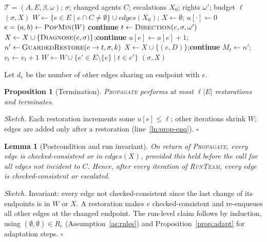 \documentclass[10pt, anonymous, conference]{IEEEtran}
\theoremstyle{definition}
\theoremstyle{plain}
\newtheorem{proposition}{Proposition}[section]
\newtheorem{lemma}{Lemma}[section]
\theoremstyle{remark}
\newcommand{\team}{\mathcal{T}}
\begin{document}
\begin{algorithm}[t]
\caption{\textsc{Propagate}: consistency over the network (L0)}
\label{alg:prop}
\small
\begin{algorithmic}[1]
\Input $\team=(A,E,\beta,\omega)$; $\sigma$; changed agents $C$;
escalations $X_0$; rights $\omega'$; budget $\ell$
\Output $(\sigma,X)$
\State $W\gets\{e\in E\mid e\cap C\neq\emptyset\}\cup\mathit{edges}(X_0)$;\;
       $X\gets\emptyset$;\; $u[\cdot]\gets0$
  \State $e=(a,b)\gets\textsc{PopMin}(W)$
   \textbf{continue}\label{ln:prop-ok}
  \EndIf
  \State $t\gets\textsc{Direction}(e,\sigma,\omega')$
    \State $X\gets X\cup\{\textsc{Diagnose}(e,\sigma)\}$;\;\textbf{continue}
  \EndIf
  \State $u[e]\gets u[e]+1$;\;
         $n'\gets\textsc{GuardedRestore}(e\to t,\sigma,k)$
   $X\gets X\cup\{(e,D)\}$;\;\textbf{continue}\EndIf
    \State $M_t\gets n'$;\; $v_t\gets v_t+1$
    \State $W\gets W\cup\{e'\in E\setminus\{e\}\mid t\in e'\}$
           \label{ln:prop-enq}
  \EndIf
\EndWhile
\State \Return $(\sigma,X)$
\end{algorithmic}
\end{algorithm}

Let $d_e$ be the number of other edges sharing an endpoint with $e$.

\begin{proposition}[Termination]\label{prop:term}
\textsc{Propagate} performs at most $\ell|E|$ restorations and terminates.
\end{proposition}
\noindent\emph{Sketch.} Each restoration increments some $u[e]\le\ell$; other
iterations shrink $W$; edges are added only after a restoration
(line~\ref{ln:prop-enq}). \hfill$\square$

\begin{lemma}[Postcondition and run invariant]\label{lem:inv}
On return of \textsc{Propagate}, every edge is checked-consistent or in
$\mathit{edges}(X)$, provided this held before the call for all edges not
incident to $C$. Hence, after every iteration of \textsc{RunTeam}, every edge
is checked-consistent or escalated.
\end{lemma}
\noindent\emph{Sketch.} Invariant: every edge not checked-consistent since the
last change of its endpoints is in $W$ or $X$. A restoration makes $e$
checked-consistent and re-enqueues all other edges at the changed endpoint.
The run-level claim follows by induction, using $(\emptyset,\emptyset)\in R_e$
(Assumption~\ref{as:rules}) and Proposition~\ref{prop:adapt} for adaptation
steps. \hfill$\square$
\end{document}
